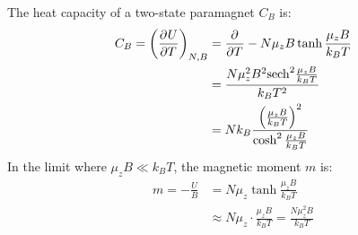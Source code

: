 \documentclass{article}
\begin{document}
The heat capacity of a two-state paramagnet $C_B$ is:
\begin{equation}
    \begin{split}
        C_B = {\left(\frac{\partial^{}U} {\partial T^{}}\right)}_{N,B} & = \frac{\partial^{}} {\partial T^{}}-N\mu_z B\tanh\frac{\mu_z B}{k_B T} \\
        & = \frac{N{\mu}_z^2B^2\mathrm{sech}^2\frac{\mu_z B}{k_B T}}{k_B T^2} \\
        & = Nk_B\frac{{\left(\frac{\mu_z B}{k_B T}\right)}^2}{\cosh^2\frac{\mu_z B}{k_B T}}
    \end{split}
\end{equation}
In the limit where $\mu_z B \ll k_B T$, the magnetic moment $m$ is:
\begin{equation}
    \begin{split}
        m = -\frac{U}{B} & = N\mu_z\tanh\frac{\mu_z B}{k_B T} \\
        & \approx N\mu_z \cdot \frac{\mu_z B}{k_B T} = \frac{N\mu_z^2B}{k_B T}
    \end{split}
\end{equation}
\begin{center}
\end{center}

\clearpage
\end{document}
